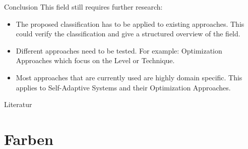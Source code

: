 \documentclass[en,16:9]{sdqbeamer}
\begin{document}
\begin{frame}{Conclusion}
	This field still requires further research:
	\begin{itemize}
		\item The proposed classification has to be applied to existing approaches.
		This could verify the classification and give a structured overview of the field.
		\item Different approaches need to be tested.
		For example: Optimization Approaches which focus on the Level or Technique.
		\item Most approaches that are currently used are highly domain specific.
		This applies to Self-Adaptive Systems and their Optimization Approaches.
	\end{itemize}
\end{frame}

\appendix
\beginbackup

\begin{frame}{Literatur}
\printbibliography
\end{frame}

\section{Farben}


\end{document}
